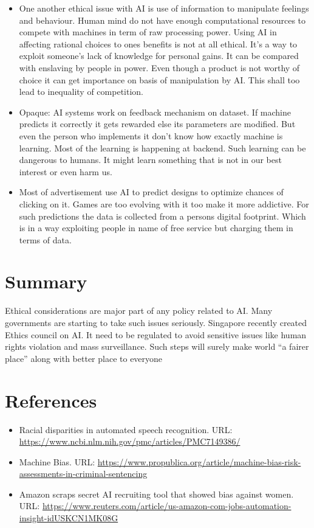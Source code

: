 \documentclass{article}
\begin{document}
\begin{itemize}
\item One another ethical issue with AI is use of information to manipulate feelings and behaviour. Human mind do not have enough computational resources to compete with machines in term of raw processing power. Using AI in affecting rational choices to ones benefits is not at all ethical. It’s a way to exploit someone’s lack of knowledge for personal gains. It can be compared with enslaving by people in power. Even though a product is not worthy of choice it can get importance on basis of manipulation by AI. This shall too lead to inequality of competition.
\item Opaque: AI systems work on feedback mechanism on dataset. If machine predicts it correctly it gets rewarded else its parameters are modified. But even the person who implements it don’t know how exactly machine is learning. Most of the learning is happening at backend. Such learning can be dangerous to humans. It might learn something that is not in our best interest or even harm us.
\item Most of advertisement use AI to predict designs to optimize chances of clicking on it. Games are too evolving with it too make it more addictive. For such predictions the data is collected from a persons digital footprint. Which is in a way exploiting people in name of free service but charging them in terms of data. 
\end{itemize}
\section{Summary}
Ethical considerations are major part of any policy related to AI. Many governments are starting to take such issues seriously. Singapore recently created Ethics council on AI. It need to be regulated to avoid sensitive issues like human rights violation and mass surveillance. Such steps will surely make world “a fairer place” along with better place to everyone
\section{References}
\begin{itemize}
    \item Racial disparities in automated speech recognition. URL: \url{https://www.ncbi.nlm.nih.gov/pmc/articles/PMC7149386/}
    \item Machine Bias. URL: \url{https://www.propublica.org/article/machine-bias-risk-assessments-in-criminal-sentencing}
    \item Amazon scraps secret AI recruiting tool that showed bias against women. URL: \url{https://www.reuters.com/article/us-amazon-com-jobs-automation-insight-idUSKCN1MK08G}
\end{itemize}
\end{document}
